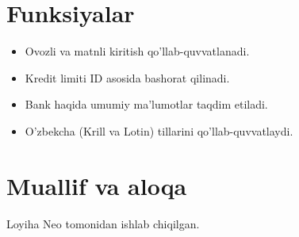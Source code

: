 \documentclass[a4paper,12pt]{article}
\begin{document}
\section{Funksiyalar}
\begin{itemize}
    \item Ovozli va matnli kiritish qo'llab-quvvatlanadi.
    \item Kredit limiti ID asosida bashorat qilinadi.
    \item Bank haqida umumiy ma'lumotlar taqdim etiladi.
    \item O'zbekcha (Krill va Lotin) tillarini qo'llab-quvvatlaydi.
\end{itemize}

\section{Muallif va aloqa}
Loyiha Neo tomonidan ishlab chiqilgan.
\end{document}
